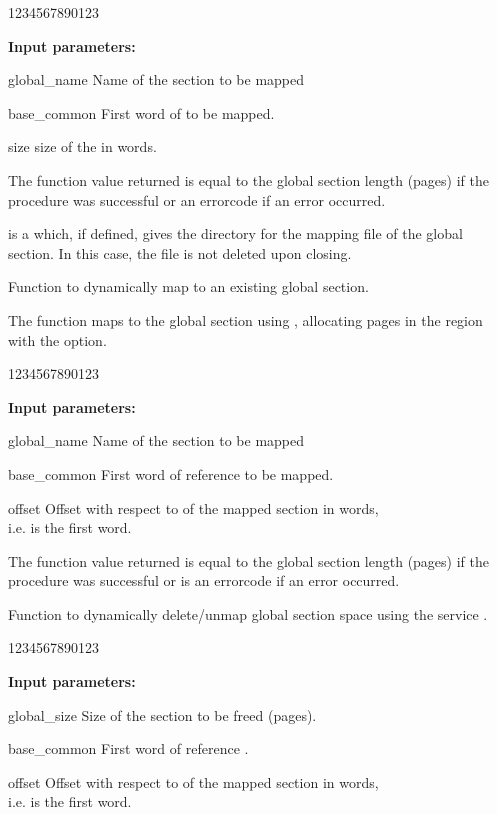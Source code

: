 \begin{DLtt}{1234567890123}
\item[{\rm\bf Input parameters:}]
\item[global\_name] Name of the section to be mapped
\item[base\_common] First word of  to be mapped.
\item[size]         size of the  in words.
\end{DLtt}

The function value returned is equal to the global section length 
(pages) if the procedure was successful or an errorcode  if
an error occurred.

 is a  which, if defined, gives the directory
for the mapping file of the global section.
In this case, the file is not deleted upon closing.


\Action  Function to dynamically map to an existing global section.

The function maps to the global section using ,
allocating pages in the  region with the  option.

\begin{DLtt}{1234567890123}
\item[{\rm\bf Input parameters:}]
\item[global\_name] Name of the section to be mapped
\item[base\_common] First word of reference  to be mapped.
\item[offset]       Offset with respect to  of the mapped 
                    section in words,\\
                    i.e.  is the first word.
\end{DLtt}

The function value returned is equal to the global section length 
(pages) if the procedure was successful or is an errorcode  if
an error occurred.


\Action  Function to dynamically delete/unmap global section space
using the service .

\begin{DLtt}{1234567890123}
\item[{\rm\bf Input parameters:}]
\item[global\_size] Size of the section to be freed (pages).
\item[base\_common] First word of reference .
\item[offset]       Offset with respect to  of the mapped 
                    section in words,\\
                    i.e.  is the first word.
\end{DLtt}


